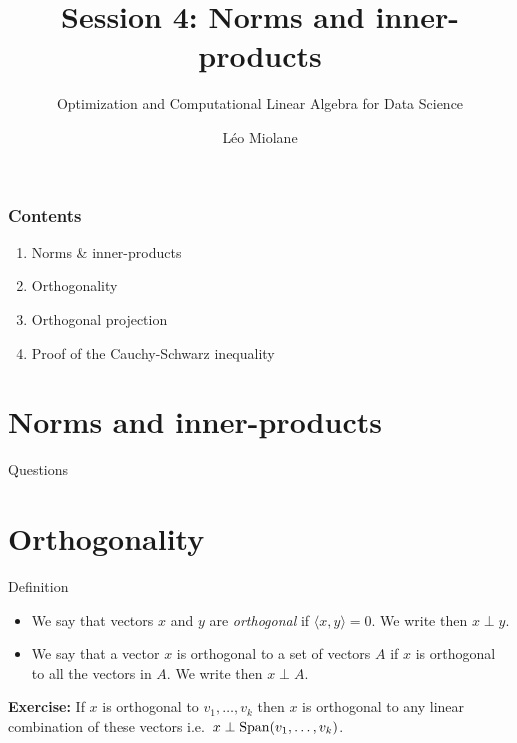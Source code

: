 \documentclass{beamer}
\title{Session 4: Norms and inner-products}
\subtitle{Optimization and Computational Linear Algebra for Data Science}
\author{Léo Miolane}
\date{}
\begin{document}
\setcounter{showProgressBar}{0}
\setcounter{showSlideNumbers}{0}

\frame{\titlepage}

\begin{frame}
	\frametitle{Contents}
	\begin{enumerate}
		\item Norms \& inner-products
		\item Orthogonality
		\item Orthogonal projection
		\item Proof of the Cauchy-Schwarz inequality
	\end{enumerate}
\end{frame}


\setcounter{framenumber}{0}
\setcounter{showSlideNumbers}{1}
\section{Norms and inner-products}
\begin{frame}[t]{Questions}
	\grid 

	\pause
	\pause
\end{frame}

\section{Orthogonality}

\begin{frame}[t]{Definition}
	\grid 

	\vspace{-0.4cm}
	\begin{definition}
		\begin{itemize}
			\item We say that vectors $x$ and $y$ are \emph{orthogonal} if $\langle x,y \rangle = 0$. We write then $x \perp y$.
			\item We say that a vector $x$ is orthogonal to a set of vectors $A$ if $x$ is orthogonal to all the vectors in $A$. We write then $x \perp A$.
		\end{itemize}
	\end{definition}


	\textbf{Exercise:}
		If $x$ is orthogonal to $v_1, \dots, v_k$ then $x$ is orthogonal to any linear combination of these vectors i.e.\ $x \perp {{\rm Span}}(v_1, \dots, v_k)$.
\end{frame}
\end{document}
